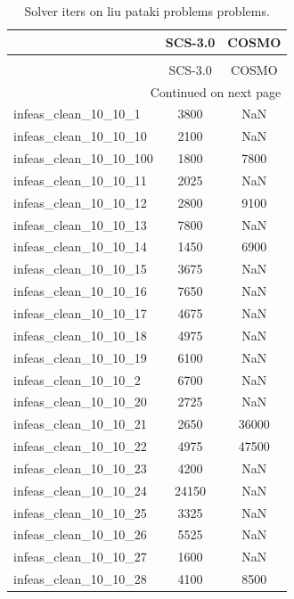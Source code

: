 \begin{longtable}{lcc}
\caption{Solver iters on liu pataki problems problems.}
\label{t-liu pataki problems-iters}\\
\toprule
{} &  SCS-3.0 &  COSMO \\
\midrule
\endfirsthead
\caption[]{Solver iters on liu pataki problems problems.} \\
\toprule
{} &  SCS-3.0 &  COSMO \\
\midrule
\endhead
\midrule
\multicolumn{3}{r}{{Continued on next page}} \\
\midrule
\endfoot

\bottomrule
\endlastfoot
infeas\_clean\_10\_10\_1   &     3800 &    NaN \\
infeas\_clean\_10\_10\_10  &     2100 &    NaN \\
infeas\_clean\_10\_10\_100 &     1800 &   7800 \\
infeas\_clean\_10\_10\_11  &     2025 &    NaN \\
infeas\_clean\_10\_10\_12  &     2800 &   9100 \\
infeas\_clean\_10\_10\_13  &     7800 &    NaN \\
infeas\_clean\_10\_10\_14  &     1450 &   6900 \\
infeas\_clean\_10\_10\_15  &     3675 &    NaN \\
infeas\_clean\_10\_10\_16  &     7650 &    NaN \\
infeas\_clean\_10\_10\_17  &     4675 &    NaN \\
infeas\_clean\_10\_10\_18  &     4975 &    NaN \\
infeas\_clean\_10\_10\_19  &     6100 &    NaN \\
infeas\_clean\_10\_10\_2   &     6700 &    NaN \\
infeas\_clean\_10\_10\_20  &     2725 &    NaN \\
infeas\_clean\_10\_10\_21  &     2650 &  36000 \\
infeas\_clean\_10\_10\_22  &     4975 &  47500 \\
infeas\_clean\_10\_10\_23  &     4200 &    NaN \\
infeas\_clean\_10\_10\_24  &    24150 &    NaN \\
infeas\_clean\_10\_10\_25  &     3325 &    NaN \\
infeas\_clean\_10\_10\_26  &     5525 &    NaN \\
infeas\_clean\_10\_10\_27  &     1600 &    NaN \\
infeas\_clean\_10\_10\_28  &     4100 &   8500 \\

\end{longtable}
